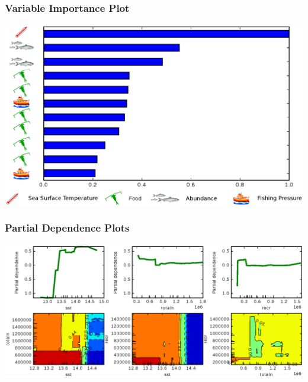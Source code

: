 \documentclass{beamer}
\begin{document}

\begin{frame}
    \frametitle{Variable Importance Plot}
\includegraphics[scale=0.55]{../fig/featureCS}
\end{frame}


\begin{frame}
\frametitle{Partial Dependence Plots}
\includegraphics[scale=0.47]{../fig/partdepCS}
\end{frame}
\end{document}
